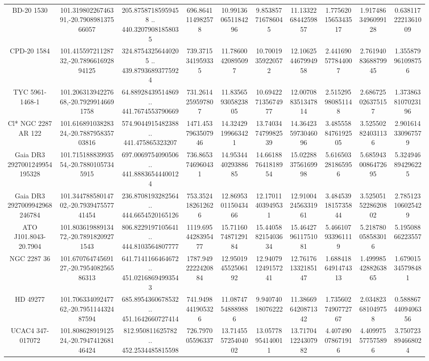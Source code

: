 \begin{table}
\begin{tabular}{cccccccccc}
BD-20  1530 & 101.31980226746391,-20.790898137566057 & 205.87587185959458 .. 440.32079081858035 & 696.8641114982578 & 10.991360651184296 & 9.853857716786045 & 11.133226844259857 & 1.7756201565343517 & 1.9174863496099128 & 0.6381172221361009 \\
CPD-20  1584 & 101.41559721128732,-20.789661692894125 & 324.87543256440205 .. 439.87936893775924 & 739.3715341959335 & 11.78600420895097 & 10.70019359220572 & 12.106254467994958 & 2.441690577844007 & 2.7619408368879945 & 1.355879961098756 \\
TYC 5961-1468-1 & 101.20631394227668,-20.79299146691758 & 64.88928439514869 .. 441.7674553790669 & 731.2614259597807 & 11.835659305823805 & 10.694227135674977 & 12.007088351347814 & 2.515295980851148 & 2.686725026375157 & 1.3738638107023196 \\
Cl* NGC 2287     AR     122 & 101.61689103828324,-20.788795835703816 & 574.9044915482388 .. 441.475865323207 & 1471.4537963507946 & 14.32429199663421 & 13.740347479982539 & 14.364235973046096 & 3.4855588476192505 & 3.525502824031136 & 2.901614330967579 \\
Gaia DR3 2927001249954195328 & 101.71518883993554,-20.78801057345915 & 697.0069754090506 .. 441.88836544400124 & 736.8653746960431 & 14.953444029388685 & 14.661887641818954 & 15.022883756169998 & 5.616503281865956 & 5.6859430086472695 & 5.324946894296225 \\
Gaia DR3 2927009942968246784 & 101.34478858014702,-20.793947557741454 & 236.8708193282564 .. 444.6654520165126 & 753.3524182612626 & 12.869530115043466 & 12.17011403949531 & 12.910042456331961 & 3.4845391815735844 & 3.5250515228620802 & 2.785123106025429 \\
ATO J101.8043-20.7904 & 101.80361988913472,-20.78918209271543 & 806.8229197105641 .. 444.8103564807777 & 1119.6954428395477 & 15.711607487129184 & 15.440588215403634 & 15.464279611751081 & 5.466107933961119 & 5.218780058583016 & 5.19508866223557 \\
NGC  2287    36 & 101.67076474569127,-20.795408256586313 & 641.7141166464672 .. 451.02168694993543 & 1787.9492222420884 & 12.950194552506192 & 12.940791249157241 & 12.761761332185147 & 1.6884186491474313 & 1.4999854288263865 & 1.679015345798481 \\
HD  49277 & 101.70633409247762,-20.795114432487594 & 685.8954360678532 .. 451.1642660727414 & 741.9498441905326 & 11.08747548889886 & 9.94074018076222 & 11.386696420871342 & 1.7356027490772767 & 2.034823681049758 & 0.5888674409406356 \\
UCAC4 347-017072 & 101.80862891912524,-20.794741268146424 & 812.950811625782 .. 452.2534485815598 & 726.797005596337 & 13.714555725404002 & 13.05778954140011 & 13.717041224307982 & 4.407490078671916 & 4.409975577575896 & 3.750723894668024 \\

\end{tabular}
\end{table}
